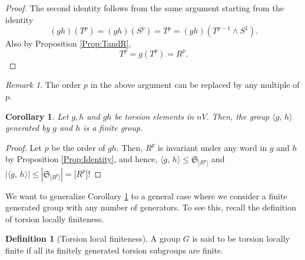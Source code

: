 \documentclass[12pt,reqno]{amsart}
\theoremstyle{plain}
\newtheorem{corollary}[theorem]{Corollary}
\theoremstyle{definition}
\newtheorem{definition}{Definition}[section]
\theoremstyle{remark}
\newtheorem{remark}{Remark}[section]
\numberwithin{equation}{section}
\begin{document}
\begin{proof}
	The second identity follows from the same argument starting 
	from the identity 
	\begin{equation*} 
		(gh)(T^p) = (gh)(S^p) = T^p = (gh)(T^{p-1} \wedge S^1).  
	\end{equation*} 
	Also by Proposition \ref{Prop:TandR}, 
	\begin{equation*} 
		T^p = g(T^p) = R^p.  
	\end{equation*}  
\end{proof} 

\begin{remark} 
	The order  $p$  in the above argument can be replaced 
	by any multiple of  $p$.   
\end{remark} 

\begin{corollary}\label{Cor:TwoGenerator} 
 	Let  $g, h$  and  $gh$  be torsion elements in  $nV.$ 
	Then, 
	the group  $\langle g, \, h \rangle$  generated by  $g$  and  $h$  is a finite group.    
\end{corollary}  
\begin{proof}  
	Let  $p$  be the order of  $gh$.  
	Then,  
	$R^p$  is invariant under any word in  $g$  and  $h$  by Proposition \ref{Prop:Identity}, 
	and hence, 
	$\langle g, \, h \rangle \leq \mathfrak{S}_{|R^{p}|}$  and  
	$|\langle g, \, h \rangle| \leq |\mathfrak{S}_{|R^{p}|}| = |R^p|!$   
\end{proof} 

We want to generalize Corollary \ref{Cor:TwoGenerator} to 
a general case where we consider a finite generated group with any number of generators.
To see this, 
recall the definition of torsion locally finiteness.  

\begin{definition}[Torsion local finiteness]
         A group $G$ is said to be torsion locally finite 
         if all its finitely generated torsion subgroups are finite. 
\end{definition}
\end{document}
